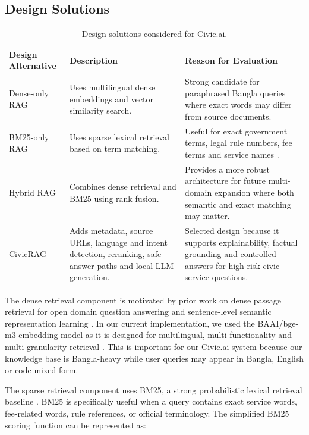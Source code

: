 \documentclass[12pt,oneside,openany]{report}
\begin{document}
\subsection{Design Solutions}

\begin{table}[h]
\centering
\caption{Design solutions considered for Civic.ai.}
\begin{tabular}{|p{3.2cm}|p{5.4cm}|p{5.2cm}|}
\hline
\textbf{Design Alternative} & \textbf{Description} & \textbf{Reason for Evaluation} \\
\hline
Dense-only RAG & Uses multilingual dense embeddings and vector similarity search. & Strong candidate for paraphrased Bangla queries where exact words may differ from source documents. \\
\hline
BM25-only RAG & Uses sparse lexical retrieval based on term matching. & Useful for exact government terms, legal rule numbers, fee terms and service names \cite{robertson2009bm25}. \\
\hline
Hybrid RAG & Combines dense retrieval and BM25 using rank fusion. & Provides a more robust architecture for future multi-domain expansion where both semantic and exact matching may matter. \\
\hline
CivicRAG & Adds metadata, source URLs, language and intent detection, reranking, safe answer paths and local LLM generation. & Selected design because it supports explainability, factual grounding and controlled answers for high-risk civic service questions. \\
\hline
\end{tabular}
\end{table}

The dense retrieval component is motivated by prior work on dense passage retrieval for open domain question answering \cite{karpukhin2020dpr} and sentence-level semantic representation learning \cite{reimers2019sbert}. In our current implementation, we used the BAAI/bge-m3 embedding model as it is designed for multilingual, multi-functionality and multi-granularity retrieval \cite{chen2024bgem3}. This is important for our Civic.ai system because our knowledge base is Bangla-heavy while user queries may appear in Bangla, English or code-mixed form.

The sparse retrieval component uses BM25, a strong probabilistic lexical retrieval baseline \cite{robertson2009bm25}. BM25 is specifically useful when a query contains exact service words, fee-related words, rule references, or official terminology. The simplified BM25 scoring function can be represented as:
\end{document}
